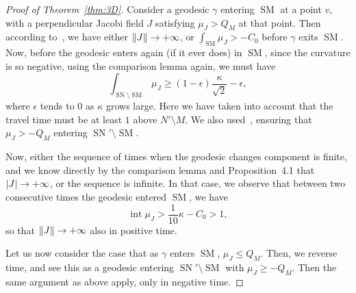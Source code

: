 \documentclass[AHL,Unicode,longabstracts,published]{cedram}
\DeclareMathOperator{\intt}{int}
\DeclareMathOperator{\SM}{SM}
\DeclareMathOperator{\SN}{SN}
\theoremstyle{plain}
\renewcommand*{\to}{\mathchoice{\longrightarrow}{\rightarrow}{\rightarrow}{\rightarrow}}
\begin{document}
\begin{proof}[Proof of Theorem~\ref{thm:3D}]
Consider a geodesic $\gamma$ entering $\SM$ at a point $v$, with a perpendicular Jacobi field $J$ satisfying $\mu_J> Q_M$ at that point. Then according to~\cite[Proposition~4.1]{Chen-Erchenko-Gogolev}, we have either $\|J\|\to+\infty$, or $\int_{\SM} \mu_J > -C_0$ before $\gamma$ exits $\SM$. Now, before the geodesic enters again (if it ever does) in $\SM$, since the curvature is so negative, using the comparison lemma again, we must have
\[
\int_{\SN\setminus \SM} \mu_J\geq (1-\epsilon) \frac{\kappa}{\sqrt{2}} - \epsilon,
\]
where $\epsilon$ tends to $0$ as $\kappa$ grows large. Here we have taken into account that the travel time must be at least $1$ above $N'\setminus M$. We also used~\cite[Proposition~4.1]{Chen-Erchenko-Gogolev}, ensuring that $\mu_J>-Q_M$ entering $\SN'\setminus \SM$.

Now, either the sequence of times when the geodesic changes component is finite, and we know directly by the comparison lemma and Proposition~4.1 that $|J|\to+\infty$, or the sequence is infinite. In that case, we observe that between two consecutive times the geodesic entered $\SM$, we have
\[
\intt \mu_J > \frac{1}{10}\kappa - C_0 > 1,
\]
so that $\|J\|\to+\infty$ also in positive time.

Let us now consider the case that as $\gamma$ enters $\SM$, $\mu_J \leq Q_M$. Then, we reverse time, and see this as a geodesic entering $\SN'\setminus \SM$ with $\mu_J \geq - Q_M$. Then the same argument as above apply, only in negative time.
\end{proof}



\end{document}
